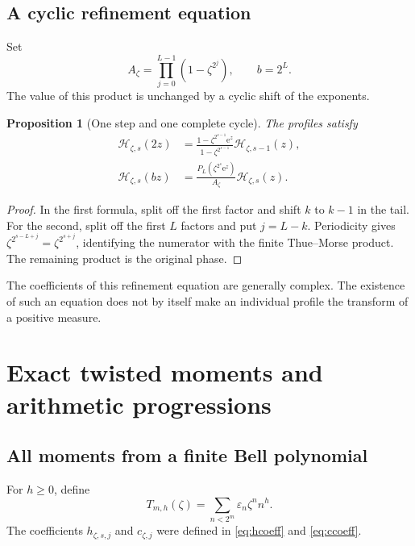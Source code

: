 \documentclass[11pt,letterpaper]{article}
\numberwithin{equation}{section}
\newtheorem{proposition}[theorem]{Proposition}
\theoremstyle{definition}
\theoremstyle{remark}
\newcommand{\eps}{\varepsilon}
\newcommand{\Hp}{\mathcal H}
\newcommand{\e}{\mathrm e}
\begin{document}
\subsection{A cyclic refinement equation}
Set
\begin{equation}
 A_\zeta=\prod_{j=0}^{L-1}(1-\zeta^{2^j}),\qquad b=2^L.
 \label{eq:Acycle}
\end{equation}
The value of this product is unchanged by a cyclic shift of the exponents.

\begin{proposition}[One step and one complete cycle]
The profiles satisfy
\begin{align}
 \Hp_{\zeta,s}(2z)
 &=\frac{1-\zeta^{2^{s-1}}\e^z}{1-\zeta^{2^{s-1}}}
     \Hp_{\zeta,s-1}(z),\label{eq:onestep}\\
 \Hp_{\zeta,s}(bz)
 &=\frac{P_L(\zeta^{2^s}\e^z)}{A_\zeta}\Hp_{\zeta,s}(z).
 \label{eq:cycle}
\end{align}
\end{proposition}
\begin{proof}
In the first formula, split off the first factor and shift \(k\) to \(k-1\) in the tail. For the second, split off the first \(L\) factors and put \(j=L-k\). Periodicity gives \(\zeta^{2^{s-L+j}}=\zeta^{2^{s+j}}\), identifying the numerator with the finite Thue--Morse product. The remaining product is the original phase.
\end{proof}
The coefficients of this refinement equation are generally complex. The existence of such an equation does not by itself make an individual profile the transform of a positive measure.

\section{Exact twisted moments and arithmetic progressions}
\label{sec:moments}

\subsection{All moments from a finite Bell polynomial}
For \(h\geq0\), define
\begin{equation}
 T_{m,h}(\zeta)=\sum_{n<2^m}\eps_n\zeta^n n^h.
 \label{eq:Tmoment}
\end{equation}
The coefficients \(h_{\zeta,s,j}\) and \(c_{\zeta,j}\) were defined in \eqref{eq:hcoeff} and \eqref{eq:ccoeff}.
\end{document}
